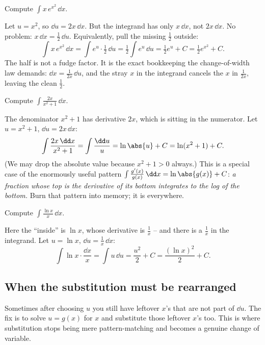 \begin{example}
\label{ch22:ex-constant}
Compute $\displaystyle \int x\,e^{x^2}\,\dd x$.

Let $u = x^2$, so $\dd u = 2x\,\dd x$. But the integrand has only $x\,\dd x$, not
$2x\,\dd x$. No problem: $x\,\dd x = \tfrac12\,\dd u$. Equivalently, pull the missing
$\tfrac12$ outside:
\[
  \int x\,e^{x^2}\,\dd x = \int e^{u}\cdot \tfrac12\,\dd u
   = \tfrac12\int e^{u}\,\dd u = \tfrac12 e^{u} + C = \tfrac12 e^{x^2} + C.
\]
The half is not a fudge factor. It is the exact bookkeeping the change-of-width law
demands: $\dd x = \tfrac{1}{2x}\,\dd u$, and the stray $x$ in the integrand cancels
the $x$ in $\tfrac{1}{2x}$, leaving the clean $\tfrac12$.
\end{example}

\begin{example}
\label{ch22:ex-log}
Compute $\displaystyle \int \frac{2x}{x^2+1}\,\dd x$.

The denominator $x^2+1$ has derivative $2x$, which is sitting in the numerator. Let
$u = x^2+1$, $\dd u = 2x\,\dd x$:
\[
  \int \frac{2x\,\dd x}{x^2+1} = \int \frac{\dd u}{u} = \ln\abs{u} + C
   = \ln(x^2+1) + C.
\]
(We may drop the absolute value because $x^2+1 > 0$ always.) This is a special case
of the enormously useful pattern $\int \frac{g'(x)}{g(x)}\,\dd x = \ln\abs{g(x)} +
C$: \emph{a fraction whose top is the derivative of its bottom integrates to the log
of the bottom.} Burn that pattern into memory; it is everywhere.
\end{example}

\begin{example}
\label{ch22:ex-lnx}
Compute $\displaystyle \int \frac{\ln x}{x}\,\dd x$.

Here the ``inside'' is $\ln x$, whose derivative is $\tfrac1x$ -- and there is a
$\tfrac1x$ in the integrand. Let $u = \ln x$, $\dd u = \tfrac1x\,\dd x$:
\[
  \int \ln x\cdot\frac{\dd x}{x} = \int u\,\dd u = \frac{u^2}{2}+C
   = \frac{(\ln x)^2}{2} + C.
\]
\end{example}

\subsection{When the substitution must be rearranged}

Sometimes after choosing $u$ you still have leftover $x$'s that are not part of
$\dd u$. The fix is to solve $u = g(x)$ for $x$ and substitute those leftover
$x$'s too. This is where substitution stops being mere pattern-matching and becomes
a genuine change of variable.

